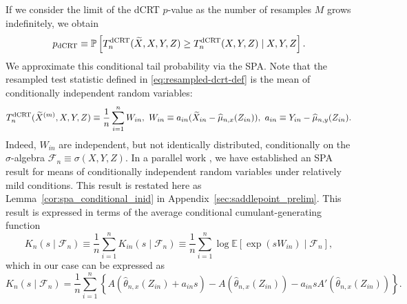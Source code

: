 \documentclass[12pt]{article}
\theoremstyle{definition}
\def\P{\mathbb{P}}
\def\P{\mathbb{P}}
\newcommand{\E}{\mathbb E}								%
\renewcommand{\P}{\mathbb{P}}							%
\newcommand{\srx}{X}									%
\newcommand{\srz}{Z}									%
\newcommand{\srxk}{\widetilde X}						%
\newcommand{\sry}{Y}									%
\newcommand{\dCRT}{\textnormal{dCRT}} 					%
\begin{document}
If we consider the limit of the dCRT $p$-value as the number of resamples $M$ grows indefinitely, we obtain
\begin{align*}
p_{\dCRT} \equiv \P\left[T_n^{\dCRT}(\widetilde{X},X,Y,Z)\geq T_n^{\dCRT}(X,Y,Z) \mid X,Y,Z\right].
\end{align*}
We approximate this conditional tail probability via the SPA. Note that the resampled test statistic defined in \eqref{eq:resampled-dcrt-def} is the mean of  conditionally independent random variables:
\begin{align*}
  T_n^{\dCRT}(\srxk^{(m)}, \srx, \sry, \srz) \equiv \frac{1}{n}\sum_{i=1}^n W_{in},\ W_{in}\equiv a_{in}(\widetilde X_{in}-\widehat{\mu}_{n,x}(Z_{in})),\ a_{in}\equiv Y_{in}-\widehat\mu_{n,y}(Z_{in}).
\end{align*}
Indeed, $W_{in}$ are independent, but not identically distributed, conditionally on the $\sigma$-algebra $\mathcal{F}_n \equiv \sigma(\srx,\sry,\srz)$. In a parallel work \citep{Niu2024}, we have established an SPA result for means of conditionally independent random variables under relatively mild conditions. This result is restated here as Lemma~\ref{cor:spa_conditional_inid} in Appendix~\ref{sec:saddlepoint_prelim}. This result is expressed in terms of the average conditional cumulant-generating function
\begin{equation} \label{eq:accgf}
K_n(s \mid \mathcal F_n) \equiv \frac{1}{n} \sum_{i = 1}^n K_{in}(s \mid \mathcal F_n) \equiv \frac{1}{n}\sum_{i = 1}^n \log \E[\exp(s W_{in}) \mid \mathcal F_n],
\end{equation}
which in our case can be expressed as
\begin{equation}
K_n(s \mid \mathcal F_n) = \frac{1}{n}\sum_{i = 1}^n \left\{A(\widehat \theta_{n,x}(\srz_{in})+a_{in}s)-A(\widehat \theta_{n,x}(\srz_{in}))-a_{in}sA'(\widehat \theta_{n,x}(\srz_{in}))\right\}.
\end{equation}
\end{document}
